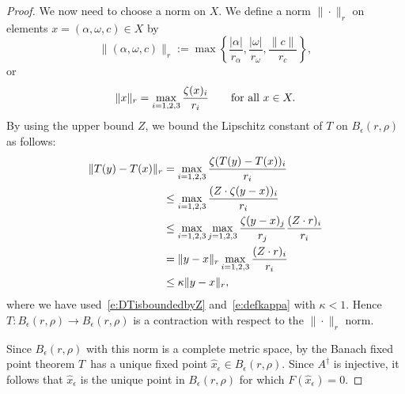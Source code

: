 \begin{proof}
We now need to choose a norm on $X$. 
We define a norm $ \| \cdot \|_r$ on elements $x = (\alpha,\omega,c) \in X$
by
\[  
\| (\alpha, \omega, c) \|_r := \max 
\left\{  		  
	 \frac{|\alpha|}{r_\alpha},
	 \frac{|\omega|}{r_\omega},
	 \frac{\|c\|}{r_{c}} \right\} , 
\]
or
\[
  \|x\|_r = \max_{i=1,2,3} \frac{ \zeta(x)_i}{r_i}
  \qquad \text{for all } x \in X.
\]
%
By using the upper bound $Z$, we bound the Lipschitz constant of $T$ on $B_\epsilon(r, \rho)$ as follows:
\begin{alignat*}{1}
 \| T(y) - T(x) \|_r 
    &= \max_{i=1,2,3} \frac{\zeta(T(y) - T(x))_i} {r_i} \\
    &\leq  \max_{i=1,2,3}  \frac{(Z \cdot \zeta(y-x))_i}{r_i} \\
    &\leq  \max_{i=1,2,3} \max_{j=1,2,3}\frac{\zeta(y-x)_j}{r_j}  
				   \frac{(Z \cdot r )_i}{r_i} \\
    & = \| y-x \|_r \max_{i=1,2,3} \frac{(Z \cdot r )_i}{r_i} \\
    & \leq \kappa \| y-x \|_r,
\end{alignat*}
where we have used~\eqref{e:DTisboundedbyZ} and~\eqref{e:defkappa} with $\kappa<1$.
Hence $T:B_{\epsilon}(r,\rho) \to B_{\epsilon}(r,\rho)$ is a contraction with respect to the $\| \cdot \|_r$ norm.

Since $B_\epsilon(r,\rho)$ with this norm is a complete metric space, by the Banach fixed point theorem $T$~has a unique fixed point $ \hat{x}_\epsilon \in B_\epsilon(r,\rho)$. 
Since $A^\dagger$ is injective,  it follows that $ \hat{x}_\epsilon$   is the unique point in $B_\epsilon(r,\rho)$ for which $ F(\hat{x}_\epsilon) =0$. 
\end{proof}

